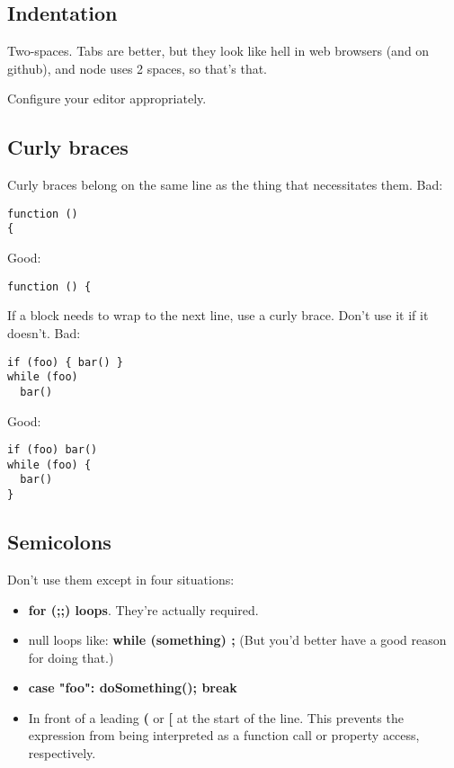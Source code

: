 \subsection{Indentation}
Two-spaces. Tabs are better, but they look like hell in web browsers (and on github), and node uses 2 spaces, so that's that.

Configure your editor appropriately.

\subsection{Curly braces}

Curly braces belong on the same line as the thing that necessitates them. Bad:

\lstset{language=Javascript,caption=Bad curly braces placement - 1}
\begin{lstlisting}
function ()
{
\end{lstlisting}
  
Good:

\lstset{language=Javascript,caption=Good curly braces placement - 1}
\begin{lstlisting}
function () {
\end{lstlisting}

If a block needs to wrap to the next line, use a curly brace. Don't use it if it doesn't. Bad:

\lstset{language=Javascript,caption=Bad curly braces placement - 2}
\begin{lstlisting}
if (foo) { bar() }
while (foo)
  bar()
\end{lstlisting}

Good:

\lstset{language=Javascript,caption=Good curly braces placement - 2}
\begin{lstlisting}
if (foo) bar()
while (foo) {
  bar()
}
\end{lstlisting}

\subsection{Semicolons}

Don't use them except in four situations:

\begin{itemize}
  \item \textbf{for (;;) loops}. They're actually required.
  \item null loops like: \textbf{while (something) ;} (But you'd better have a good reason for doing that.)
  \item \textbf{case "foo": doSomething(); break}
  \item In front of a leading \textbf{(} or \textbf{[} at the start of the line. This prevents the expression from being interpreted as a function call or property access, respectively.
\end{itemize}

